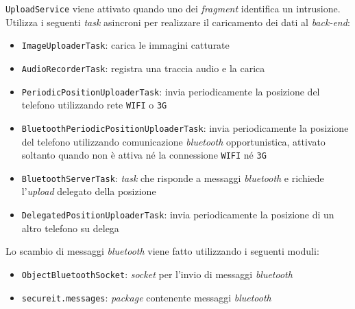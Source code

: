 \texttt{UploadService} viene attivato quando uno dei \textit{fragment} identifica un intrusione. Utilizza i seguenti \textit{task} asincroni per realizzare il caricamento dei dati al \textit{back-end}:
\begin{itemize}
	\item \texttt{ImageUploaderTask}: carica le immagini catturate
	\item \texttt{AudioRecorderTask}: registra una traccia audio e la carica
	\item \texttt{PeriodicPositionUploaderTask}: invia periodicamente la posizione del telefono utilizzando rete \texttt{WIFI} o \texttt{3G}
	\item \texttt{Bluetooth\allowbreak Periodic\allowbreak Position\allowbreak Uploader\allowbreak Task}: invia periodicamente la posizione del telefono utilizzando comunicazione \textit{bluetooth} opportunistica, attivato soltanto quando non è attiva né la connessione \texttt{WIFI} né \texttt{3G}
	\item \texttt{BluetoothServerTask}: \textit{task} che risponde a messaggi \textit{bluetooth} e richiede l'\textit{upload} delegato della posizione
	\item \texttt{DelegatedPositionUploaderTask}: invia periodicamente la posizione di un altro telefono su delega
\end{itemize}

Lo scambio di messaggi \textit{bluetooth} viene fatto utilizzando i seguenti moduli:

\begin{itemize}
	\item \texttt{ObjectBluetoothSocket}: \textit{socket} per l'invio di messaggi \textit{bluetooth}
	\item \texttt{secureit.messages}: \textit{package} contenente messaggi \textit{bluetooth}
\end{itemize}


